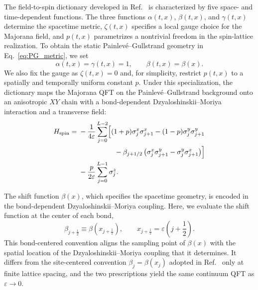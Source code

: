 \documentclass[reprint,amsmath,amssymb,aps,prb,floatfix,showkeys,superscriptaddress]{revtex4-2}
\begin{document}
The field-to-spin dictionary developed in
Ref.~\cite{Kinoshita2025} is characterized by five space- and
time-dependent functions. The three functions
$\alpha(t,x)$, $\beta(t,x)$, and $\gamma(t,x)$ determine the
spacetime metric, $\zeta(t,x)$ specifies a local gauge choice for the
Majorana field, and $p(t,x)$ parametrizes a nontrivial freedom in the
spin-lattice realization. To obtain the static
Painlev\'e--Gullstrand geometry in Eq.~\eqref{eq:PG_metric}, we set
\begin{equation}
  \alpha(t,x)=\gamma(t,x)=1,
  \qquad
  \beta(t,x)=\beta(x).
  \label{eq:dictionary_specialization}
\end{equation}
We also fix the gauge as $\zeta(t,x)=0$ and, for simplicity, restrict
$p(t,x)$ to a spatially and temporally uniform constant $p$. 
Under this specialization, the dictionary maps the Majorana QFT on
the Painlev\'e--Gullstrand background onto an anisotropic $XY$ chain
with a bond-dependent Dzyaloshinskii--Moriya interaction and a transverse field:
\begin{align}
  H_{\mathrm{spin}}
  ={}&
  -\frac{1}{4\varepsilon}
  \sum_{j=0}^{L-2}
  \Bigl[
    (1+p)\sigma_j^x\sigma_{j+1}^x
    -(1-p)\sigma_j^y\sigma_{j+1}^y
  \nonumber\\
  &\hspace{18mm}
    -\beta_{j+1/2}
    \left(
      \sigma_j^x\sigma_{j+1}^y
      -
      \sigma_j^y\sigma_{j+1}^x
    \right)
  \Bigr]
  \nonumber\\
  &-\frac{p}{2\varepsilon}
  \sum_{j=0}^{L-1}\sigma_j^z.
  \label{eq:spin_Hamiltonian}
\end{align}


The shift function $\beta(x)$, which specifies the spacetime geometry, is encoded in the bond-dependent
Dzyaloshinskii--Moriya coupling. Here, we evaluate the shift function at the center of each bond,
\begin{equation}
  \beta_{j+\frac12}
  \equiv
  \beta\left(x_{j+\frac12}\right),
  \qquad
  x_{j+\frac12}
  =
  \varepsilon\left(j+\frac12\right).
  \label{eq:lattice_beta}
\end{equation}
This bond-centered convention aligns the sampling point of
$\beta(x)$ with the spatial location of the
Dzyaloshinskii--Moriya coupling that it determines. It differs from
the site-centered convention
$\beta_j=\beta(x_j)$ adopted in Ref.~\cite{Kinoshita2025} only at
finite lattice spacing, and the two prescriptions yield the same
continuum QFT as $\varepsilon\to0$.
\end{document}
